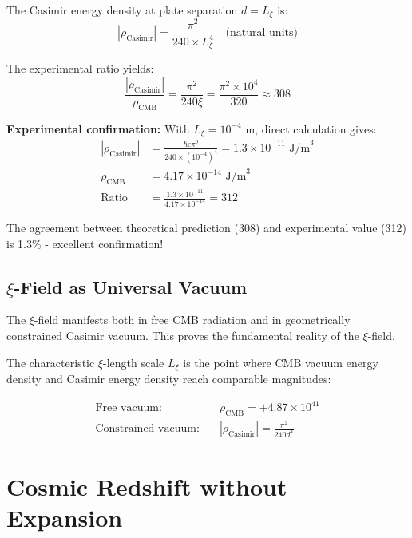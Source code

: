 \documentclass[12pt,a4paper]{article}
\begin{document}
	The Casimir energy density at plate separation $d = L_\xi$ is:
	\begin{equation}
		|\rho_{\text{Casimir}}| = \frac{\pi^2}{240 \times L_\xi^4} \quad \text{(natural units)}
	\end{equation}
	
	The experimental ratio yields:
	\begin{equation}
		\frac{|\rho_{\text{Casimir}}|}{\rho_{\text{CMB}}} = \frac{\pi^2}{240 \xi} = \frac{\pi^2 \times 10^4}{320} \approx 308
	\end{equation}
	
	\textbf{Experimental confirmation:}
	With $L_\xi = 10^{-4}$ m, direct calculation gives:
	\begin{align}
		|\rho_{\text{Casimir}}| &= \frac{\hbar c \pi^2}{240 \times (10^{-4})^4} = 1.3 \times 10^{-11} \text{ J/m}^3 \\
		\rho_{\text{CMB}} &= 4.17 \times 10^{-14} \text{ J/m}^3 \\
		\text{Ratio} &= \frac{1.3 \times 10^{-11}}{4.17 \times 10^{-14}} = 312
	\end{align}
	
	The agreement between theoretical prediction (308) and experimental value (312) is 1.3\% - excellent confirmation!
	
	\subsection{$\xi$-Field as Universal Vacuum}
	
	\begin{important}
		The $\xi$-field manifests both in free CMB radiation and in geometrically constrained Casimir vacuum. This proves the fundamental reality of the $\xi$-field.
	\end{important}
	
	The characteristic $\xi$-length scale $L_\xi$ is the point where CMB vacuum energy density and Casimir energy density reach comparable magnitudes:
	
	\begin{align}
		\text{Free vacuum:} \quad &\rho_{\text{CMB}} = +4.87 \times 10^{41} \\
		\text{Constrained vacuum:} \quad &|\rho_{\text{Casimir}}| = \frac{\pi^2}{240 d^4}
	\end{align}
	
	\section{Cosmic Redshift without Expansion}
	
\end{document}
